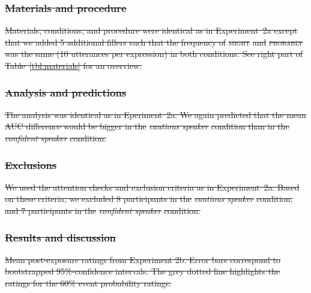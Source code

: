 \documentclass[man, floatsintext]{apa6}
\newcommand{\tableref}[1]{Table~\ref{#1}}
\providecommand{\DIFdel}[1]{{\protect\color{red}\sout{#1}}}                      %
\providecommand{\DIFdelFL}[1]{\DIFdel{#1}} %
\begin{document}
\subsubsection{\DIFdel{Materials and procedure}}
\addtocounter{subsubsection}{-1}%

\DIFdel{Materials, conditions, and procedure were identical as in Experiment~2a except that we added 5 additional fillers such
that the frequency of }\textsc{\DIFdel{might}} %
\DIFdel{and }\textsc{\DIFdel{probably}} %
\DIFdel{was the same (10 utterances per expression) in both conditions. 
See right part of \tableref{tbl:materials} for an overview.
}%

\subsubsection{\DIFdel{Analysis and predictions}}  
\addtocounter{subsubsection}{-1}%

\DIFdel{The analysis was identical as in Eperiment~2a. We again predicted that the mean AUC difference would be bigger in the 
}\emph{\DIFdel{cautious speaker}} %
\DIFdel{condition than in the }\emph{\DIFdel{confident speaker}} %
\DIFdel{condition.
}%

\subsubsection{\DIFdel{Exclusions}} %
\addtocounter{subsubsection}{-1}%
\DIFdel{We used the attention checks and exclusion criteria as in Experiment~2a.  Based on these criteria, we excluded 8 participants in the }\textit{\DIFdel{cautious speaker}} %
\DIFdel{condition, and 7 participants in the }\textit{\DIFdel{confident speaker}} %
\DIFdel{condition.
}%

\subsubsection{\DIFdel{Results and discussion}}
\addtocounter{subsubsection}{-1}%

{%
\DIFdelFL{Mean post-exposure ratings from Experiment 2b. Error bars correspond to bootstrapped 95\%-confidence intervals.  The grey dotted line highlights the ratings for the 60\% event probability ratings. }%
}
\end{document}
